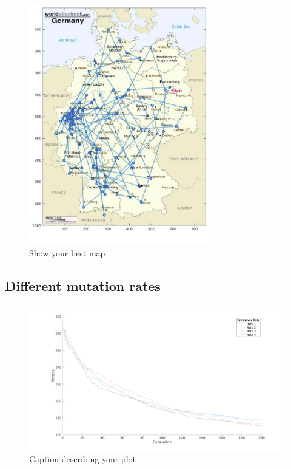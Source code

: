 \documentclass[a4paper, 12pt]{article}
\begin{document}
\begin{figure}[ht!]
  \centering
  \includegraphics[width=0.7\textwidth]{images/resultmap}
    \caption{Show your best map \label{fig:xxx1}}
\end{figure}

\newpage
\subsection{Different mutation rates}

\begin{figure}[ht!]
	\centering
	\includegraphics[width=1.0\textwidth]{images/crossfig}
	\caption{Caption describing your plot \label{fig:crossfig}}
\end{figure}
\end{document}
